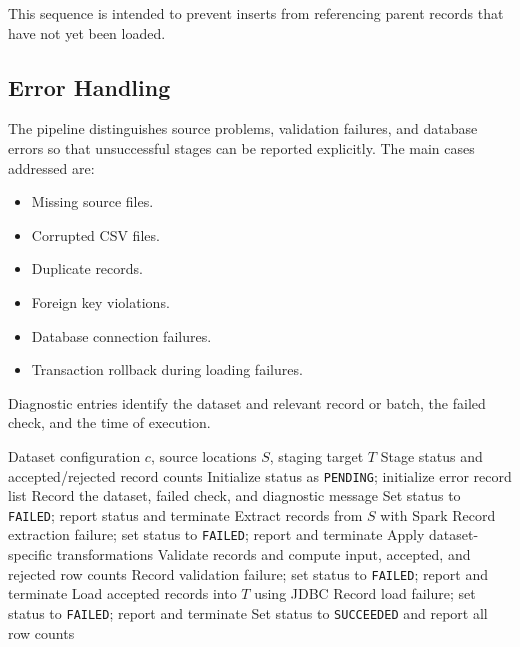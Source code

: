 \documentclass[conference]{IEEEtran}
\begin{document}
This sequence is intended to prevent inserts from referencing parent records that have not yet been loaded.

\subsection{Error Handling}

The pipeline distinguishes source problems, validation failures, and database errors so that unsuccessful stages can be reported explicitly. The main cases addressed are:

\begin{itemize}
    \item Missing source files.
    \item Corrupted CSV files.
    \item Duplicate records.
    \item Foreign key violations.
    \item Database connection failures.
    \item Transaction rollback during loading failures.
\end{itemize}

Diagnostic entries identify the dataset and relevant record or batch, the failed check, and the time of execution.

\begin{algorithm}[!t]
\caption{Dataset ETL with Explicit Failure Status}
\label{alg:etl-status}
\begin{algorithmic}[1]
\Require Dataset configuration $c$, source locations $S$, staging target $T$
\Ensure Stage status and accepted/rejected record counts
\State Initialize status as \texttt{PENDING}; initialize error record list
    \State Record the dataset, failed check, and diagnostic message
    \State Set status to \texttt{FAILED}; report status and terminate
\EndIf
\State Extract records from $S$ with Spark
    \State Record extraction failure; set status to \texttt{FAILED}; report and terminate
\EndIf
\State Apply dataset-specific transformations
\State Validate records and compute input, accepted, and rejected row counts
    \State Record validation failure; set status to \texttt{FAILED}; report and terminate
\EndIf
\State Load accepted records into $T$ using JDBC
    \State Record load failure; set status to \texttt{FAILED}; report and terminate
\EndIf
\State Set status to \texttt{SUCCEEDED} and report all row counts
\end{algorithmic}
\end{algorithm}
\end{document}
